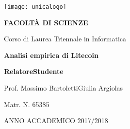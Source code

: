 \begin{spacing}{0.90}
\begin{center}
{\Large \thispagestyle{empty}}{\texttt{[image: unicalogo]}}\par
\end{center}
\end{spacing}

\noindent 
\begin{center}
\vspace{0.7cm}
\textbf{}\par
\end{center}{\LARGE \par}

\noindent 
\begin{center}
\textbf{\large FACOLT\`A DI SCIENZE}\par
\end{center}{\large \par}

\noindent
\begin{center}
{\large Corso di Laurea Triennale in Informatica}\par  %
\end{center}{\large \par}

\vspace{2.6cm}


\begin{center}
\textbf{\LARGE Analisi empirica di Litecoin}\par
\end{center}{\LARGE \par}


\begin{spacing}{0.90}
\vspace{3.7cm}
\textbf{\large Relatore}{\large \hfill{}}\textbf{\large Studente}{\large \par}
\end{spacing}

{\large Prof. Massimo Bartoletti\hfill{}Giulia Argiolas~}{\large \par}

\begin{spacing}{0.90}
{\large \hfill{}Matr. N. 65385}{\large \par}
\end{spacing}

\vspace{2.5cm}


\begin{center}
ANNO ACCADEMICO 2017/2018\par 
\end{center}
